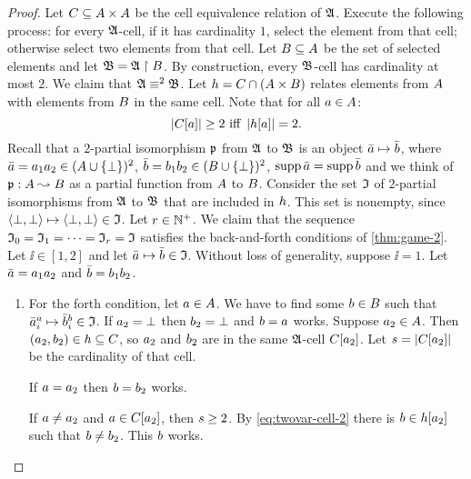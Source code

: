 \begin{proof}
Let $C \subseteq {A\times A}$ be the cell equivalence relation of $\mathfrak{A}$.
Execute the following process: for every $\mathfrak{A}$-cell, if it has cardinality
$1$, select the element from that cell; otherwise select two elements from that
cell.
Let $B \subseteq A$ be the set of selected elements and let
$\mathfrak{B} = \mathfrak{A} \restriction B$.
By construction, every $\mathfrak{B}$-cell has cardinality at most $2$.
We claim that $\mathfrak{A} \equiv^{2} \mathfrak{B}$.
Let $h = C \cap (A \times B)$ relates elements from $A$ with
elements from $B$ in the same cell.
Note that for all $a \in A$:
\begin{equation}\label{eq:twovar-cell-2}
  \miff{
  \card{\relC[\ea]} \geq 2}{
  \card{\selh[\ea]} = 2}.
\end{equation}
Recall that a $2$-partial isomorphism $\mathfrak{p}$ from $\mathfrak{A}$ to $\mathfrak{B}$ is an
object $\bar{a} \mapsto \bar{b}$, where
$\bar{a} = a_{1}a_{2} \in (A \cup \left\{\bot\right\})^2$,
$\bar{b} = b_{1}b_{2} \in (B \cup \left\{\bot\right\})^2$,
$\operatorname{supp}\bar{a} = \operatorname{supp}\bar{b}$
and we think of $\mathfrak{p}: A \leadsto B$ as a partial function from $A$
to $B$.
Consider the set $\mathfrak{I}$ of $2$-partial isomorphisms from
$\mathfrak{A}$ to $\mathfrak{B}$ that are included in $h$.
This set is nonempty, since $\left\langle \bot,\bot \right\rangle \mapsto \left\langle \bot,\bot \right\rangle \in
\mathfrak{I}$.
Let $r \in \mathbb{N}^{+}$. We claim that the sequence
$\mathfrak{I}_{0} = \mathfrak{I}_{1} = \dots = \mathfrak{I}_{r} = \mathfrak{I}$
satisfies the back-and-forth conditions of \cref{thm:game-2}.
Let $\ii \in [1,2]$ and let $\bar{a} \mapsto \bar{b} \in \mathfrak{I}$.
Without loss of generality, suppose $\ii = 1$.
Let $\bar{a} = a_{1}a_{2}$ and $\bar{b} = b_{1}b_{2}$.
\begin{enumerate}
  \item For the forth condition, let $a \in A$. 
  We have to find some $b \in B$ such that
  $\bar{a}_{i}^{a} \mapsto \bar{b}_{i}^{b} \in \mathfrak{I}$.
  If $a_{2} = \bot$ then $b_{2} = \bot$ and $b = a$ works.
  Suppose $a_{2} \in A$. Then $(a_{2},b_{2}) \in h \subseteq C$, so
  $a_{2}$ and $b_{2}$ are in the same $\mathfrak{A}$-cell $C[a_{2}]$.
  Let $s = \left|C[a_{2}]\right|$ be the cardinality of that cell.
 
  If $a = a_{2}$ then $b = b_{2}$ works.
 
  If $a \neq a_{2}$ and $a \in C[a_{2}]$, then $s \geq 2$.
  By \cref{eq:twovar-cell-2} there is $b \in h[a_{2}]$ such that
  $b \neq b_{2}$. This $b$ works.


\end{enumerate}
\end{proof}
